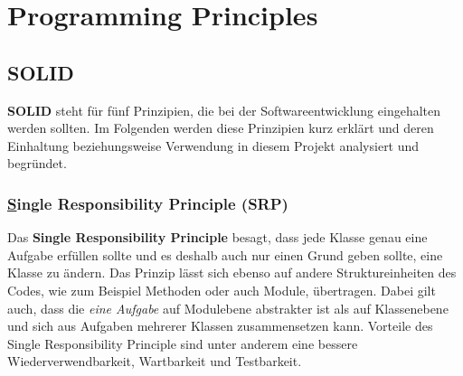 \chapter{Programming Principles}

\section{SOLID}

\textbf{SOLID} steht für fünf Prinzipien, die bei der Softwareentwicklung eingehalten werden sollten. 
Im Folgenden werden diese Prinzipien kurz erklärt und deren Einhaltung beziehungsweise Verwendung in diesem Projekt analysiert und begründet.


\subsection{\underline{S}ingle Responsibility Principle (SRP)}
\label{sec:SRP}

Das \textbf{Single Responsibility Principle} besagt, dass jede Klasse genau eine Aufgabe erfüllen sollte und es deshalb auch nur einen Grund geben sollte, eine Klasse zu ändern.
Das Prinzip lässt sich ebenso auf andere Struktureinheiten des Codes, wie zum Beispiel Methoden oder auch Module, übertragen.
Dabei gilt auch, dass die \textit{eine Aufgabe} auf Modulebene abstrakter ist als auf Klassenebene und sich aus Aufgaben mehrerer Klassen zusammensetzen kann.
\newline
Vorteile des Single Responsibility Principle sind unter anderem eine bessere Wiederverwendbarkeit, Wartbarkeit  und Testbarkeit.

